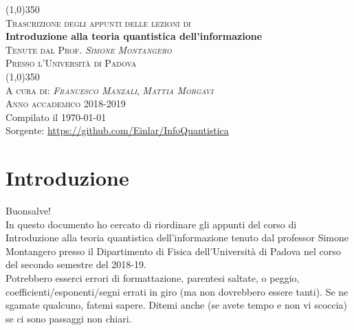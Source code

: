 \documentclass[12pt]{report} %
\makeatletter
\newcommand{\onlyinsubfile}[1]{#1}
\newcommand{\notinsubfile}[1]{}
\renewcommand{\@marginparreset}{%
  \reset@font\small
  \raggedright
  \slshape
  \@setminipage
}
\theoremstyle{plain}
\theoremstyle{definition}
\theoremstyle{remark}
\makeatother
\begin{document}
\renewcommand{\onlyinsubfile}[1]{}
\renewcommand{\notinsubfile}[1]{#1}

\setlength{\aboverulesep}{0pt}
\setlength{\belowrulesep}{0pt}
\setlength{\extrarowheight}{.75ex}
\begin{center}
                \line (1,0){350} \\
                \textsc{\normalsize Trascrizione degli appunti delle lezioni di}\\
                [0.25in]
                \huge{\bfseries Introduzione alla teoria quantistica dell'informazione}\\
                [2mm]
                \textsc{\normalsize Tenute dal Prof. \textit{Simone Montangero}}
                \vspace{-0.5em}\\
                \textsc{\normalsize Presso l'Università di Padova}\\
                \vspace{-1em}
                \line (1,0){350} \\
        [0.2cm]
        \textsc{\normalsize A cura di: \textit{Francesco Manzali}, \textit{Mattia Morgavi}}\\
                \textsc{\normalsize Anno accademico 2018-2019}\\ 
        {\scriptsize Compilato il \today}\\
        \vspace{-0.5em}
        {\scriptsize Sorgente: \url{https://github.com/Einlar/InfoQuantistica}}\\
        \vspace{-0.5em}
        {\scriptsize \doclicenseLongText}
\end{center}


\makeatletter
\renewcommand{\@marginparreset}{%
  \reset@font\small
  \raggedright
  \slshape
  \@setminipage
}
\makeatother

\tableofcontents 
\clearpage
\chapter*{Introduzione}
Buonsalve!\\
In questo documento ho cercato di riordinare gli appunti del corso di Introduzione alla teoria quantistica dell'informazione tenuto dal professor Simone Montangero presso il Dipartimento di Fisica dell'Università di Padova nel corso del secondo semestre del 2018-19.\\
Potrebbero esserci errori di formattazione, parentesi saltate, o peggio, coefficienti/esponenti/segni errati in giro (ma non dovrebbero essere tanti). Se ne sgamate qualcuno, fatemi sapere. Ditemi anche (se avete tempo e non vi scoccia) se ci sono passaggi non chiari.\\
\end{document}
